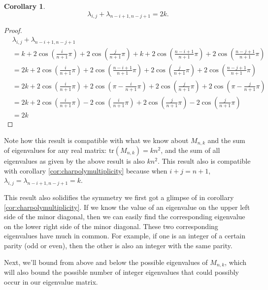 \documentclass[12pt]{article}
\newtheorem{corollary}{Corollary}
\begin{document}
	\begin{corollary}\label{cor:sum2k}
		\begin{equation*}
		\lambda_{i,j} + \lambda_{n-i+1,n-j+1} = 2k.
		\end{equation*}
	\end{corollary}
	\begin{proof}
		\begin{align*}
			&\lambda_{i,j} + \lambda_{n-i+1,n-j+1} \\
			&= k + 2\cos{\left(\frac{i}{n+1}\pi\right)} +
			2\cos{\left(\frac{j}{n+1}\pi\right)} + k +
			2\cos{\left(\frac{n-i+1}{n+1}\pi\right)} +
			2\cos{\left(\frac{n-j+1}{n+1}\pi\right)} \\
			&= 2k + 2\cos{\left(\frac{i}{n+1}\pi\right)} +
			2\cos{\left(\frac{n-i+1}{n+1}\pi\right)} + 2\cos{\left(\frac{j}{n+1}\pi\right)}
			+ 2\cos{\left(\frac{n-j+1}{n+1}\pi\right)} \\
			&= 2k + 2\cos{\left(\frac{i}{n+1}\pi\right)} +
			2\cos{\left(\pi-\frac{i}{n+1}\pi\right)} + 2\cos{\left(\frac{j}{n+1}\pi\right)}
			+ 2\cos{\left(\pi-\frac{j}{n+1}\pi\right)} \\
			&= 2k + 2\cos{\left(\frac{i}{n+1}\pi\right)} -
			2\cos{\left(\frac{i}{n+1}\pi\right)} + 2\cos{\left(\frac{j}{n+1}\pi\right)} -
			2\cos{\left(\frac{j}{n+1}\pi\right)} \\
			&= 2k
		\end{align*}
	\end{proof}
	Note how this result is compatible with what we know about $M_{n,k}$ and the
	sum of eigenvalues for any real matrix: $\text{tr}{\left(M_{n,k}\right)} =
	kn^2$, and the sum of all eigenvalues as given by the above result is also
	$kn^2$. 
	This result  also is compatible with corollary \ref{cor:charpolymultiplicity}
	because when $i+j=n+1$, $\lambda_{i,j} = \lambda_{n-i+1,n-j+1} = k$.
	
	This result also solidifies the symmetry we first got a glimpse of in corollary
	\ref{cor:charpolymultiplicity}.
	If we know the value of an eigenvalue on the upper left side of the minor
	diagonal, then we can easily find the corresponding eigenvalue on the lower
	right side of the minor diagonal.
	These two corresponding eigenvalues have much in common.
	For example, if one is an integer of a certain parity (odd or even), then the
	other is also an integer with the same parity.
	
	Next, we'll bound from above and below the possible eigenvalues of $M_{n,k}$,
	which will also bound the possible number of integer eigenvalues that could
	possibly occur in our eigenvalue matrix.
	
\end{document}
